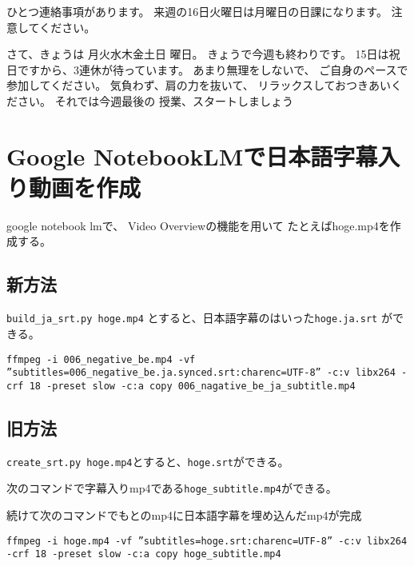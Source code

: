 \documentclass[12pt,jafontscale=0.9247]{jlreq}
\makeatletter
\newcommand{\DOWjpn}{%
	\DTMcomputedayofweekindex{\@dtm@currentyear-\@dtm@currentmonth-\@dtm@currentday}{\DOWindex}%
	\ifcase\DOWindex 月\or 火\or 水\or 木\or 金\or 土\or 日\fi%
}
\makeatother
\begin{document}
{%
ひとつ連絡事項があります。
来週の16日火曜日は月曜日の日課になります。
注意してください。


さて、きょうは\DOWjpn{}曜日。
きょうで今週も終わりです。
15日は祝日ですから、3連休が待っています。
あまり無理をしないで、
ご自身のペースで参加してください。
気負わず、肩の力を抜いて、
リラックスしておつきあいください。
%
それでは今週最後の
授業、スタートしましょう
}

\newpage
\section*{Google NotebookLMで日本語字幕入り動画を作成}


google notebook lmで、
Video Overviewの機能を用いて
たとえばhoge.mp4を作成する。

\subsection*{新方法}

\verb|build_ja_srt.py hoge.mp4| とすると、日本語字幕のはいった\verb|hoge.ja.srt| ができる。

\begin{verbatim}
ffmpeg -i 006_negative_be.mp4 -vf ”subtitles=006_negative_be.ja.synced.srt:charenc=UTF-8” -c:v libx264 -crf 18 -preset slow -c:a copy 006_nagative_be_ja_subtitle.mp4
\end{verbatim}


\subsection*{旧方法}
\verb|create_srt.py hoge.mp4|とすると、\verb|hoge.srt|ができる。

次のコマンドで字幕入りmp4である\verb|hoge_subtitle.mp4|ができる。

続けて次のコマンドでもとのmp4に日本語字幕を埋め込んだmp4が完成


\begin{verbatim}
ffmpeg -i hoge.mp4 -vf ”subtitles=hoge.srt:charenc=UTF-8” -c:v libx264 -crf 18 -preset slow -c:a copy hoge_subtitle.mp4
\end{verbatim}
\end{document}
